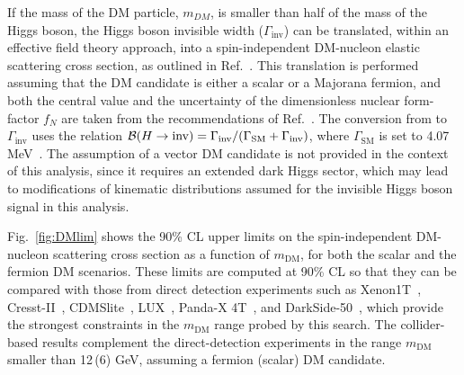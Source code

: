 If the mass of the DM particle, $m_{DM}$, is smaller than half
of the mass of the Higgs boson, the Higgs boson invisible width ($\Gamma_{\text{inv}}$) can be translated,
within an effective field theory approach, into a spin-independent
DM-nucleon elastic scattering cross section, as outlined in
Ref.~\cite{Djouadi:2011aa}. This translation is performed assuming
that the DM candidate is either a scalar or a Majorana fermion, and
both the central value and the uncertainty of the dimensionless
nuclear form-factor $f_{N}$ are taken from the recommendations of
Ref.~\cite{Hoferichter:2017olk}. The conversion from \brinv to
$\Gamma_{\text{inv}}$ uses the relation ${{\mathcal{B}(H\rightarrow\text{inv})} = \Gamma_{\text{inv}}
/ (\Gamma_{\mathrm{SM}}+\Gamma_{\text{inv}})}$, where
$\Gamma_{\mathrm{SM}}$ is set to 4.07 MeV~\cite{Heinemeyer:2013tqa}.
The assumption of a vector DM candidate is not provided in the context of this analysis, since it
requires an extended dark Higgs sector, which may lead to
modifications of kinematic distributions assumed for the invisible
Higgs boson signal in this analysis.

Fig.~\ref{fig:DMlim} shows the 90\% CL upper
limits on the spin-independent DM-nucleon scattering cross section as
a function of $m_{\mathrm{DM}}$, for both the scalar and the fermion
DM scenarios. These limits are computed at 90\% CL so that they can
be compared with those from direct detection experiments such as
Xenon1T~\cite{Aprile:2018dbl}, Cresst-II~\cite{Angloher:2015ewa},
CDMSlite~\cite{Agnese:2015nto}, LUX~\cite{Akerib:2016vxi},
Panda-X 4T~\cite{PandaX-4T:2021bab}, and
DarkSide-50~\cite{Agnes:2018ves}, which provide the strongest
constraints in the $m_{\mathrm{DM}}$ range probed by this search. The
collider-based results complement the direct-detection experiments in
the range $m_{\mathrm{DM}}$ smaller than 12\,(6) GeV, assuming a
fermion (scalar) DM candidate.


